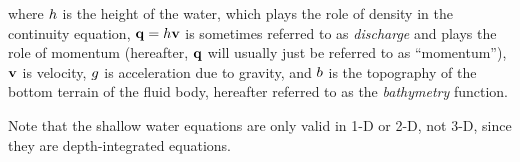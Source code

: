 where $h$ is the height of the water, which plays the role of density
in the continuity equation, $\mathbf{q}=h\mathbf{v}$ is sometimes
referred to as \emph{discharge} and plays the role of momentum (hereafter,
$\mathbf{q}$ will usually just be referred to as ``momentum''),
$\mathbf{v}$ is velocity, $g$
is acceleration due to gravity, and $b$ is the topography of the
bottom terrain of the fluid body, hereafter referred to as the \emph{bathymetry}
function.

Note that the shallow water equations are only valid in 1-D or 2-D, not 3-D,
since they are depth-integrated equations.

